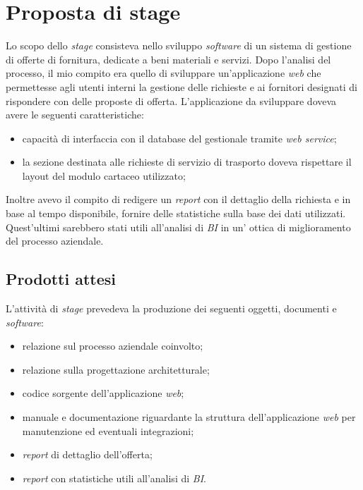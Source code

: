 \section{Proposta di stage}

Lo scopo dello \textit{stage} consisteva nello sviluppo \textit{software} di un sistema di gestione di offerte di fornitura, dedicate a beni materiali e servizi. Dopo l'analisi del processo, il mio compito era quello di sviluppare un'applicazione \textit{web} che permettesse agli utenti interni la gestione delle richieste e ai fornitori designati di rispondere con delle proposte di offerta.
L'applicazione da sviluppare doveva avere le seguenti caratteristiche:
\begin{itemize}
	\item capacità di interfaccia con il database del gestionale tramite \textit{web service};
	\item la sezione destinata alle richieste di servizio di trasporto doveva rispettare il layout del modulo cartaceo utilizzato;
\end{itemize}

Inoltre avevo il compito di redigere un \textit{report} con il dettaglio della richiesta e in base al tempo disponibile, fornire delle statistiche sulla base dei dati utilizzati.\\ Quest'ultimi sarebbero stati utili all'analisi di \textit{BI} in un' ottica di miglioramento del processo aziendale.


\subsection{Prodotti attesi}
L'attività di \textit{stage} prevedeva la produzione dei seguenti oggetti, documenti e \textit{software}:
\begin{itemize}
	\item relazione sul processo aziendale coinvolto;
	\item relazione sulla progettazione architetturale;
	\item codice sorgente dell'applicazione \textit{web};
	\item manuale e documentazione riguardante la struttura dell'applicazione \textit{web} per	manutenzione ed eventuali integrazioni;
	\item \textit{report} di dettaglio dell'offerta;
	\item \textit{report} con statistiche utili all'analisi di \textit{BI}.
\end{itemize}


